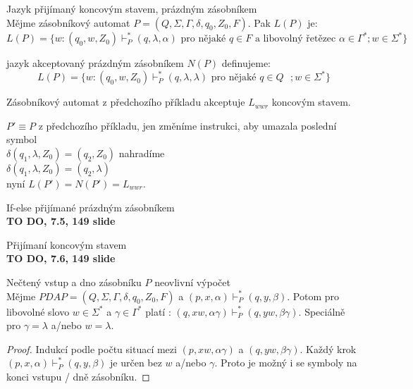 \documentclass[../main.tex]{subfiles}
\begin{document}
    \begin{definition}
        Jazyk přijímaný koncovým stavem, prázdným zásobníkem\\

        Mějme zásobníkový automat $P = (Q,\Sigma, \Gamma, \delta, q_0, Z_0, F)$. Pak $L(P)$ je:
        \[L(P) = \{w : (q_0, w, Z_0) \vdash^*_P (q, \lambda, \alpha) \text{ pro nějaké $q\in F$ a libovolný řetězec } \alpha \in \Gamma^*; w \in \Sigma^*\}\]

        jazyk akceptovaný prázdným zásobníkem $N(P)$ definujeme:
        \[L(P) = \{w : (q_0, w, Z_0) \vdash^*_P (q, \lambda, \lambda) \text{ pro nějaké $q\in Q$ }; w \in \Sigma^*\}\]
    \end{definition}

    \begin{example}
        Zásobníkový automat z předchozího příkladu akceptuje $L_{wwr}$ koncovým stavem.
    \end{example}

    \begin{example}
        $P' \equiv P$ z předchozího příkladu, jen změníme instrukci, aby umazala poslední symbol\\

        $\delta(q_1, \lambda, Z_0) = {(q_2,Z_0)}$ nahradíme\\
        $\delta(q_1, \lambda, Z_0) = {(q_2,\lambda)}$\\
        nyní $L(P') = N(P') = L_{wwr}$.        
    \end{example}

    \begin{example}
        If-else přijímané prázdným zásobníkem\\

        \textbf{TO DO, 7.5, 149 slide}
    \end{example}

    \begin{example}
        Přijímaní koncovým stavem\\

        \textbf{TO DO, 7.6, 149 slide}
    \end{example}

    \begin{theorem}
        Nečtený vstup a dno zásobníku $P$ neovlivní výpočet\\

        Mějme $PDA P = (Q,\Sigma, \Gamma, \delta, q_0, Z_0, F)$ a $(p,x,\alpha)\vdash^*_P (q,y,\beta)$.
        Potom pro libovolné slovo $w \in \Sigma^*$ a $\gamma \in \Gamma^*$ platí : $(q,xw,\alpha \gamma)\vdash^*_P (q,yw, \beta \gamma)$.
        Speciálně pro $\gamma = \lambda$ a/nebo $w = \lambda$.

        \begin{proof}
            Indukcí podle počtu situací mezi $(p, xw, \alpha \gamma)$ a $(q, yw, \beta \gamma)$. Každý krok
            $(p,x,\alpha) \vdash^*_P (q,y,\beta)$ je určen bez $w$ a/nebo $\gamma$. Proto je možný i se symboly na konci vstupu / dně zásobníku.
        \end{proof}
    \end{theorem}
\end{document}
